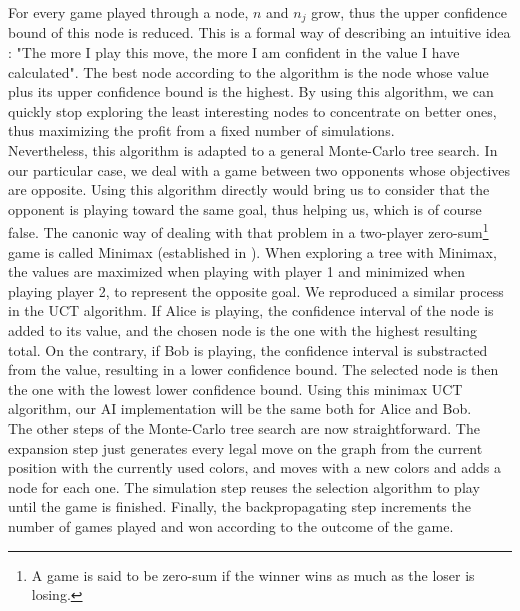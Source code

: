  For every game played through a node, $n$ and $n_j$ grow, thus the upper confidence bound of this node is reduced. This is a formal way of describing an intuitive idea : "The more I play this move, the more I am confident in the value I have calculated". The best node according to the algorithm is the node whose value plus its upper confidence bound is the highest. By using this algorithm, we can quickly stop exploring the least interesting nodes to concentrate on better ones, thus maximizing the profit from a fixed number of simulations.\\

Nevertheless, this algorithm is adapted to a general Monte-Carlo tree search. In our particular case, we deal with a game between two opponents whose objectives are opposite. Using this algorithm directly would bring us to consider that the opponent is playing toward the same goal, thus helping us, which is of course false. The canonic way of dealing with that problem in a two-player zero-sum\footnote{A game is said to be zero-sum if the winner wins as much as the loser is losing.} game is called Minimax (established in \cite{Minimax}). When exploring a tree with Minimax, the values are maximized when playing with player 1 and minimized when playing player 2, to represent the opposite goal. We reproduced a similar process in the UCT algorithm. If Alice is playing, the confidence interval of the node is added to its value, and the chosen node is the one with the highest resulting total. On the contrary, if Bob is playing, the confidence interval is substracted from the value, resulting in a lower confidence bound. The selected node is then the one with the lowest lower confidence bound.
Using this minimax UCT algorithm, our AI implementation will be the same both for Alice and Bob.\\

The other steps of the Monte-Carlo tree search are now straightforward. The expansion step just generates every legal move on the graph from the current position with the currently used colors, and moves with a new colors and adds a node for each one. The simulation step reuses the selection algorithm to play until the game is finished. Finally, the backpropagating step increments the number of games played and won according to the outcome of the game.\\

